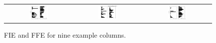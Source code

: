\begin{figure}[!htb]
\begin{tabular}{ccc}
     \includegraphics[width=0.3\textwidth]{fig/ccf/ccf7} & \includegraphics[width=0.3\textwidth]{fig/ccf/ccf8} & \includegraphics[width=0.3\textwidth]{fig/ccf/ccf9} 
 \end{tabular}
 \caption{FIE and FFE for nine example columns. } 
 \label{fig:fie_ffe_plots}
\end{figure}

\FloatBarrier

